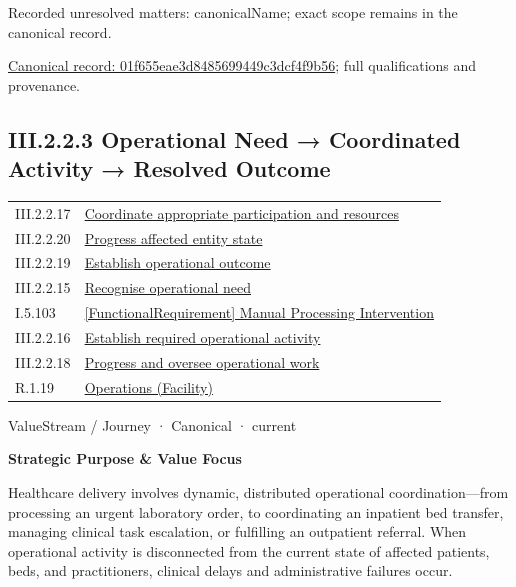 {\small Recorded unresolved matters: canonicalName; exact scope remains in the canonical record.}\par
{\footnotesize \href{../../../../continuum/strategy/value-stream/01f655eae3d8485699449c3dcf4f9b56.md}{Canonical record: 01f655eae3d8485699449c3dcf4f9b56}; full qualifications and provenance.}\par
\subsection*{III.2.2.3 Operational Need → Coordinated Activity → Resolved Outcome}
\label{navigation:III.2.2.3}

\begin{longtable}{p{.22\linewidth}p{.73\linewidth}}
III.2.2.17 & \hyperref[element:429446296e4b4a64a11b1b3d8385b12e]{Coordinate appropriate participation and resources} \\
III.2.2.20 & \hyperref[element:57880d06fd0b47d2a19d695afd7d48fc]{Progress affected entity state} \\
III.2.2.19 & \hyperref[element:79f756815e3645eb82a150870dc12502]{Establish operational outcome} \\
III.2.2.15 & \hyperref[element:843798840da0410499908004459d1fbd]{Recognise operational need} \\
I.5.103 & \hyperref[element:911511665a8a4135b7f2a37f5f79ad36]{[FunctionalRequirement] Manual Processing Intervention} \\
III.2.2.16 & \hyperref[element:a3d8f16b4c69430e9024f002bdfb6c86]{Establish required operational activity} \\
III.2.2.18 & \hyperref[element:b404dffef05e4f2bb9d414e4d1ed33af]{Progress and oversee operational work} \\
R.1.19 & \hyperref[element:df3a61b2745d45d69665cefe99db644e]{Operations (Facility)} \\
\end{longtable}
\label{element:beea615ca7b34bbcbd0ad3a2a6ab2cff}
{\small ValueStream / Journey · Canonical · current}\par

\par\medskip\textbf{Strategic Purpose \& Value Focus}\par


Healthcare delivery involves dynamic, distributed operational coordination—from processing an urgent laboratory order, to coordinating an inpatient bed transfer, managing clinical task escalation, or fulfilling an outpatient referral. When operational activity is disconnected from the current state of affected patients, beds, and practitioners, clinical delays and administrative failures occur.




